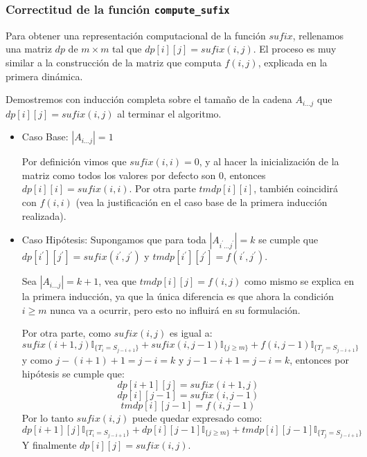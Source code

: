 \documentclass[a4paper]{article}
\begin{document}
    \subsubsection*{Correctitud de la funci\'on \texttt{compute\_sufix}}

    Para obtener una representaci\'on computacional de la funci\'on $sufix$,
    rellenamos una matriz $dp$ de $m \times m$ tal que $dp[i][j] = sufix(i,j)$. El proceso es muy similar a la construcción de la matriz que computa $f(i,j)$, explicada en la primera dinámica.
    
    Demostremos con inducción completa sobre el tamaño de la cadena $A_{i...j}$ que $dp[i][j]=sufix(i,j)$ al terminar el algoritmo.
    
    \begin{itemize}
    	\item Caso Base: $|A_{i...j}| = 1$
    	
    	Por definición vimos que $sufix(i,i) = 0$, y al hacer la inicialización de la matriz como todos los valores por defecto son $0$, entonces $dp[i][i] = sufix(i,i)$.
    	Por otra parte $tmdp[i][i]$, también coincidirá con $f(i,i)$ (vea la justificación en el caso base de la primera inducción realizada).
    	
    	\item Caso Hipótesis:
    	Supongamos que para toda $|A_{i^\prime...j^\prime}| = k$ se cumple que $dp[i^\prime][j^\prime] = sufix(i^\prime, j^\prime)$ y $tmdp[i^\prime][j^\prime] = f(i^\prime, j^\prime)$.
    	
    	Sea $|A_{i...j}| = k + 1$, vea que $tmdp[i][j] = f(i,j)$ como mismo se explica en la primera inducción, ya que la única diferencia es que ahora la condición $i \ge m$ nunca va a ocurrir, pero esto no influirá en su formulación.
    	
    	Por otra parte, como $sufix(i,j)$ es igual a:
    	$$ sufix(i+1,j)\mathbb{I}_{ \{ T_i = S_{j-i+1} \}} + 
    	sufix(i, j-1) \mathbb{I}_{ \{ j \ge m \}} + 
    	f(i, j-1) \mathbb{I}_{ \{ T_j = S_{j-i+1}\}} $$
    	y como $j-(i+1)+1 = j-i = k$ y $j-1 - i + 1 = j-i=k$, entonces por hipótesis se cumple que:
    	$$ dp[i+1][j] = sufix(i+1,j) $$
    	$$ dp[i][j-1] = sufix(i,j-1) $$
    	$$ tmdp[i][j-1] = f(i,j-1) $$
    	Por lo tanto $sufix(i,j)$ puede quedar expresado como:
    	$$ dp[i+1][j]\mathbb{I}_{ \{ T_i = S_{j-i+1} \}} + 
    	dp[i][j-1] \mathbb{I}_{ \{ j \ge m \}} + 
    	tmdp[i][j-1] \mathbb{I}_{ \{ T_j = S_{j-i+1}\}} $$
    	Y finalmente $dp[i][j] = sufix(i,j)$.    	
    \end{itemize}
	
\end{document}
